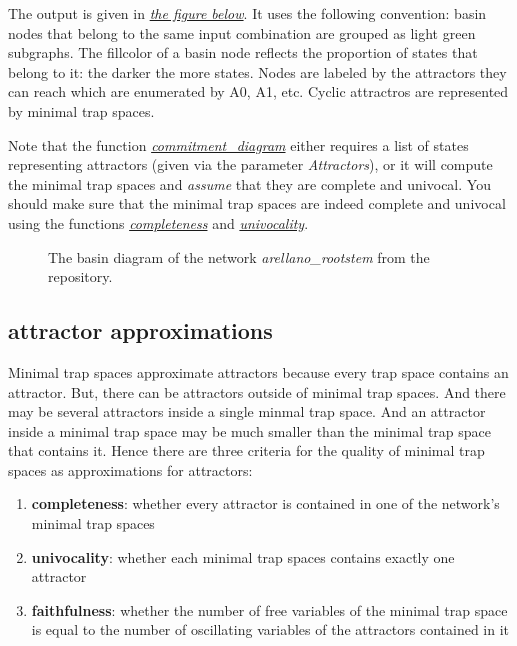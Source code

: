\documentclass[letterpaper,10pt,english]{sphinxmanual}
\begin{document}
The output is given in {\hyperref[Manual:figure26]{\emph{the figure below}}}.
It uses the following convention: basin nodes that belong to the same input combination are grouped as light green subgraphs.
The fillcolor of a basin node reflects the proportion of states that belong to it: the darker the more states.
Nodes are labeled by the attractors they can reach which are enumerated by A0, A1, etc.
Cyclic attractros are represented by minimal trap spaces.

Note that the function {\hyperref[Basins:commitment-diagram]{\emph{commitment\_diagram}}} either requires a list of states representing attractors (given via the parameter \emph{Attractors}),
or it will compute the minimal trap spaces and \emph{assume} that they are complete and univocal.
You should make sure that the minimal trap spaces are indeed complete and univocal using the functions {\hyperref[AttractorDetection:completeness]{\emph{completeness}}} and {\hyperref[AttractorDetection:univocality]{\emph{univocality}}}.
\begin{figure}[htbp]
\centering
\capstart

\caption{The basin diagram of the network \emph{arellano\_rootstem} from the repository.}\label{Manual:figure26}\end{figure}


\subsection{attractor approximations}
\label{Manual:attractor-approximations}
Minimal trap spaces approximate attractors because every trap space contains an attractor.
But, there can be attractors outside of minimal trap spaces.
And there may be several attractors inside a single minmal trap space.
And an attractor inside a minimal trap space may be much smaller than the minimal trap space that contains it.
Hence there are three criteria for the quality of minimal trap spaces as approximations for attractors:
\begin{enumerate}
\item {} 
\textbf{completeness}: whether every attractor is contained in one of the network's minimal trap spaces

\item {} 
\textbf{univocality}: whether each minimal trap spaces contains exactly one attractor

\item {} 
\textbf{faithfulness}: whether the number of free variables of the minimal trap space is equal to the number of oscillating variables of the attractors contained in it

\end{enumerate}
\end{document}
